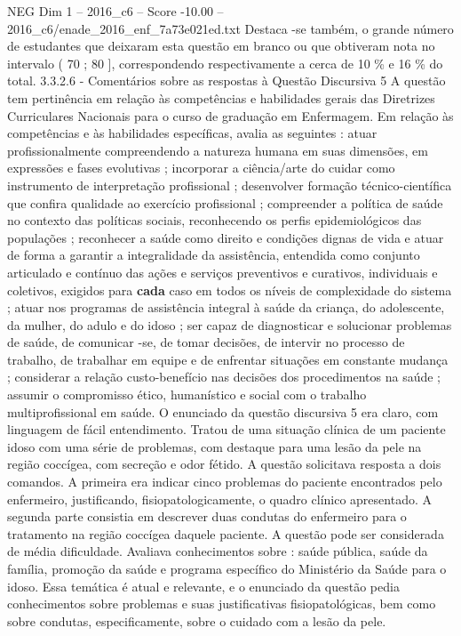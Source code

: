 \begin{textsample}{NEG Dim 1 – 2016\_c6 – Score -10.00 – 2016\_c6/enade\_2016\_enf\_7a73e021ed.txt}
Destaca -se também, o grande número de estudantes que deixaram esta questão em branco ou que obtiveram nota no intervalo ( 70 ; 80 ], correspondendo respectivamente a cerca de 10 \% e 16 \% do total. 3.3.2.6 - Comentários sobre as respostas à Questão Discursiva 5 A questão tem pertinência em relação às competências e habilidades gerais das Diretrizes Curriculares Nacionais para o curso de graduação em Enfermagem.
Em relação às competências e às habilidades específicas, avalia as seguintes : atuar profissionalmente compreendendo a natureza humana em suas dimensões, em expressões e fases evolutivas ; incorporar a ciência/arte do cuidar como instrumento de interpretação profissional ; desenvolver formação técnico-científica que confira qualidade ao exercício profissional ; compreender a política de saúde no contexto das políticas sociais, reconhecendo os perfis epidemiológicos das populações ; reconhecer a saúde como direito e condições dignas de vida e atuar de forma a garantir a integralidade da assistência, entendida como conjunto articulado e contínuo das ações e serviços preventivos e curativos, individuais e coletivos, exigidos para \textbf{cada} caso em todos os níveis de complexidade do sistema ; atuar nos programas de assistência integral à saúde da criança, do adolescente, da mulher, do adulo e do idoso ; ser capaz de diagnosticar e solucionar problemas de saúde, de comunicar -se, de tomar decisões, de intervir no processo de trabalho, de trabalhar em equipe e de enfrentar situações em constante mudança ; considerar a relação custo-benefício nas decisões dos procedimentos na saúde ; assumir o compromisso ético, humanístico e social com o trabalho multiprofissional em saúde.
O enunciado da questão discursiva 5 era claro, com linguagem de fácil entendimento.
Tratou de uma situação clínica de um paciente idoso com uma série de problemas, com destaque para uma lesão da pele na região coccígea, com secreção e odor fétido.
A questão solicitava resposta a dois comandos.
A primeira era indicar cinco problemas do paciente encontrados pelo enfermeiro, justificando, fisiopatologicamente, o quadro clínico apresentado.
A segunda parte consistia em descrever duas condutas do enfermeiro para o tratamento na região coccígea daquele paciente.
A questão pode ser considerada de média dificuldade.
Avaliava conhecimentos sobre : saúde pública, saúde da família, promoção da saúde e programa específico do Ministério da Saúde para o idoso.
Essa temática é atual e relevante, e o enunciado da questão pedia conhecimentos sobre problemas e suas justificativas fisiopatológicas, bem como sobre condutas, especificamente, sobre o cuidado com a lesão da pele.

\end{textsample}
